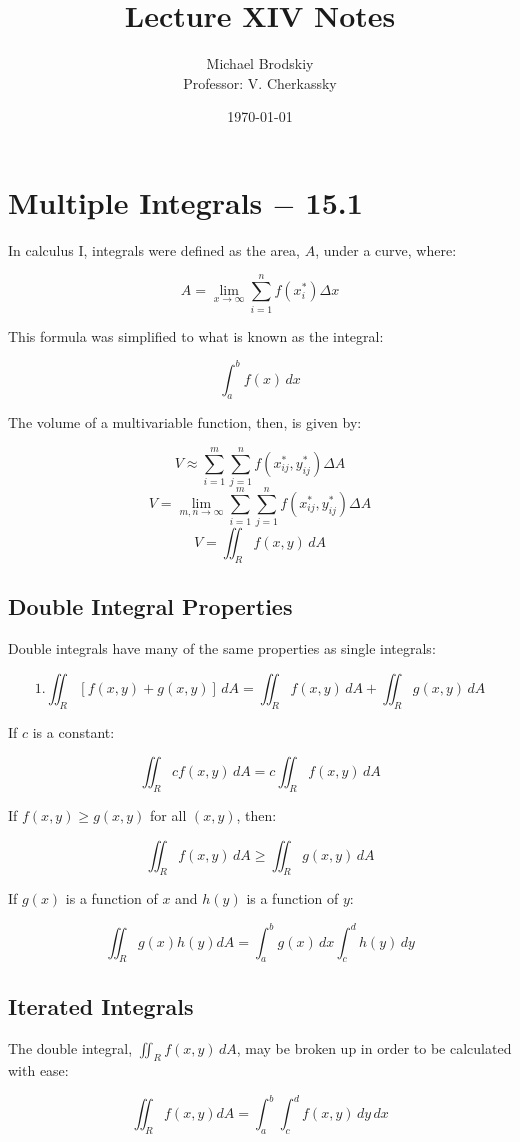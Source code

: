 \documentclass[12pt]{article}
\title{Lecture XIV Notes}
\date{\today}
\author{Michael Brodskiy\\ \small Professor: V. Cherkassky}
\begin{document}
\maketitle

\section{Multiple Integrals $-$ 15.1}

In calculus I, integrals were defined as the area, $A$, under a curve, where:

$$A=\lim_{x\to\infty}\sum_{i=1}^n f(x_i^*) \Delta x$$

This formula was simplified to what is known as the integral:

$$\int_a^b f(x)\,dx$$

The volume of a multivariable function, then, is given by:

$$V \approx \sum_{i=1}^m \sum_{j=1}^n f(x_{ij}^*, y_{ij}^*) \Delta A$$
$$V=\lim_{m,n\to\infty}\sum_{i=1}^m \sum_{j=1}^n f(x_{ij}^*, y_{ij}^*) \Delta A $$
$$V=\iint_R f(x,y)\,dA$$

\subsection{Double Integral Properties}

Double integrals have many of the same properties as single integrals:

$$1. \iint_R [f(x,y)+g(x,y)]\,dA=\iint_R f(x,y)\,dA + \iint_R g(x,y)\,dA$$

If $c$ is a constant:

$$\iint_R cf(x,y)\,dA=c\iint_R f(x,y)\,dA$$

If $f(x,y)\geq g(x,y)$ for all $(x,y)$, then:

$$\iint_R f(x,y)\,dA \geq \iint_R g(x,y)\,dA$$

If $g(x)$ is a function of $x$ and $h(y)$ is a function of $y$:

$$\iint_R g(x)h(y) dA=\int_a^b g(x)\,dx\int_c^d h(y)\,dy$$

\subsection{Iterated Integrals}

The double integral, $\iint_R f(x,y)\,dA$, may be broken up in order to be calculated with ease:

$$\iint_R f(x,y) dA=\int_a^b \int_c^d f(x,y)\,dy\,dx$$
\end{document}
